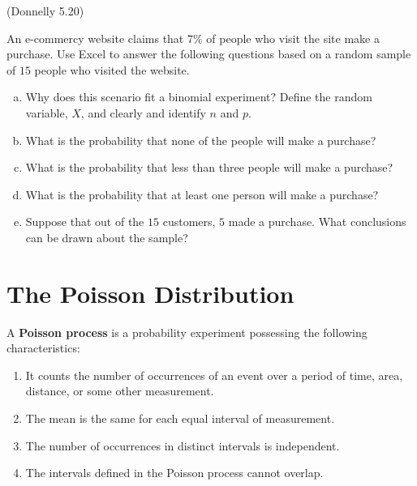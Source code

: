 \documentclass[12pt, letterpaper]{article}
\newcounter{exercise}
\theoremstyle{definition}
\begin{document}
\newpage


\begin{exercise} (Donnelly 5.20)

An e-commercy website claims that $7\%$ of people who visit the site make a purchase.  Use Excel to answer the following questions based on a random sample of $15$ people who visited the website.

\end{exercise}

\begin{enumerate}[(a)]

\item Why does this scenario fit a binomial experiment?  Define the random variable, $X$, and clearly and identify $n$ and $p$.

\vfill
\vfill
\vfill

\item What is the probability that none of the people will make a purchase?

\vfill

\item What is the probability that less than three people will make a purchase?

\vfill

\item What is the probability that at least one person will make a purchase?

\vfill

\item Suppose that out of the $15$ customers, $5$ made a purchase.  What conclusions can be drawn about the sample?

\vfill
\vfill
\vfill

\end{enumerate}


\newpage

\section*{The Poisson Distribution}

\begin{defn}
A \textbf{Poisson process} is a probability experiment possessing the following characteristics:
\begin{enumerate}
\item It counts the number of occurrences of an event over a period of time, area, distance, or some other measurement.
\item The mean is the same for each equal interval of measurement.
\item The number of occurrences in distinct intervals is independent.
\item The intervals defined in the Poisson process cannot overlap.
\end{enumerate}
\end{defn}
\end{document}

